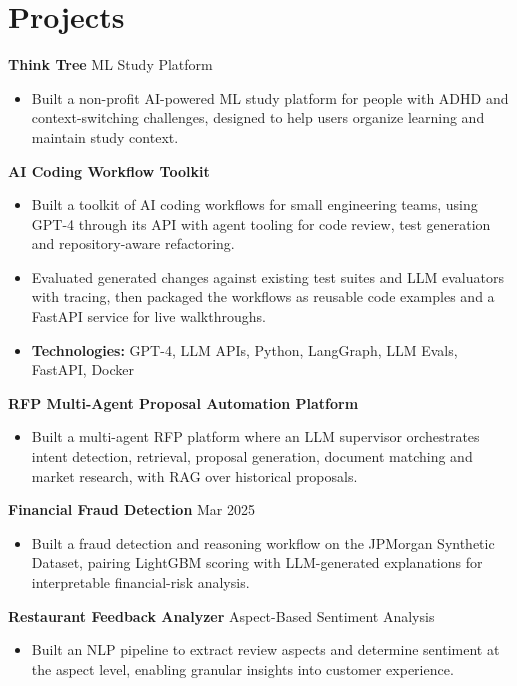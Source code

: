 \documentclass[10pt,a4paper]{article}
\begin{document}
\section{Projects}
\textbf{Think Tree} \textbar{} ML Study Platform\par
\begin{itemize}
  \item Built a non-profit AI-powered ML study platform for people with ADHD and context-switching challenges, designed to help users organize learning and maintain study context.
\end{itemize}
\textbf{AI Coding Workflow Toolkit}\par
\begin{itemize}
  \item Built a toolkit of AI coding workflows for small engineering teams, using GPT-4 through its API with agent tooling for code review, test generation and repository-aware refactoring.
  \item Evaluated generated changes against existing test suites and LLM evaluators with tracing, then packaged the workflows as reusable code examples and a FastAPI service for live walkthroughs.
  \item \textbf{Technologies:} GPT-4, LLM APIs, Python, LangGraph, LLM Evals, FastAPI, Docker
\end{itemize}
\textbf{RFP Multi-Agent Proposal Automation Platform}\par
\begin{itemize}
  \item Built a multi-agent RFP platform where an LLM supervisor orchestrates intent detection, retrieval, proposal generation, document matching and market research, with RAG over historical proposals.
\end{itemize}
\textbf{Financial Fraud Detection} \textbar{} Mar 2025\par
\begin{itemize}
  \item Built a fraud detection and reasoning workflow on the JPMorgan Synthetic Dataset, pairing LightGBM scoring with LLM-generated explanations for interpretable financial-risk analysis.
\end{itemize}
\textbf{Restaurant Feedback Analyzer} \textbar{} Aspect-Based Sentiment Analysis\par
\begin{itemize}
  \item Built an NLP pipeline to extract review aspects and determine sentiment at the aspect level, enabling granular insights into customer experience.
\end{itemize}
\end{document}
